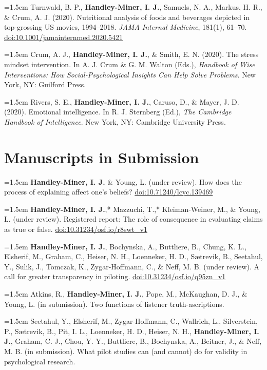 \documentclass[11pt, letterpaper]{article}
\newcommand{\pub}[1]{\par\hangindent=1.5em\hangafter=1 #1\par\vspace{0.4em}}
\begin{document}
\pub{Turnwald, B. P., \textbf{Handley-Miner, I. J.}, Samuels, N. A., Markus, H. R., \& Crum, A. J. (2020). Nutritional analysis of foods and beverages depicted in top-grossing US movies, 1994--2018. \textit{JAMA Internal Medicine}, 181(1), 61--70. \href{https://doi.org/10.1001/jamainternmed.2020.5421}{doi:10.1001/jamainternmed.2020.5421}}

\pub{Crum, A. J., \textbf{Handley-Miner, I. J.}, \& Smith, E. N. (2020). The stress mindset intervention. In A. J. Crum \& G. M. Walton (Eds.), \textit{Handbook of Wise Interventions: How Social-Psychological Insights Can Help Solve Problems}. New York, NY: Guilford Press.}

\pub{Rivers, S. E., \textbf{Handley-Miner, I. J.}, Caruso, D., \& Mayer, J. D. (2020). Emotional intelligence. In R. J. Sternberg (Ed.), \textit{The Cambridge Handbook of Intelligence}. New York, NY: Cambridge University Press.}

\section{Manuscripts in Submission}

\pub{\textbf{Handley-Miner, I. J.} \& Young, L. (under review). How does the process of explaining affect one's beliefs? \href{https://doi.org/10.71240/lcyc.139469}{doi:10.71240/lcyc.139469}}

\pub{\textbf{Handley-Miner, I. J.},* Mazzuchi, T.,* Kleiman-Weiner, M., \& Young, L. (under review). Registered report: The role of consequence in evaluating claims as true or false. \href{https://doi.org/10.31234/osf.io/r8swt_v1}{doi:10.31234/osf.io/r8swt\_v1}}

\pub{\textbf{Handley-Miner, I. J.}, Bochynska, A., Buttliere, B., Chung, K. L., Elsherif, M., Graham, C., Heiser, N. H., Loenneker, H. D., S\ae trevik, B., Seetahul, Y., Sulik, J., Tomczak, K., Zygar-Hoffmann, C., \& Neff, M. B. (under review). A call for greater transparency in piloting. \href{https://doi.org/10.31234/osf.io/q95zn_v1}{doi:10.31234/osf.io/q95zn\_v1}}

\pub{Atkins, R., \textbf{Handley-Miner, I. J.}, Pope, M., McKaughan, D. J., \& Young, L. (in submission). Two functions of listener truth-ascriptions.}

\pub{Seetahul, Y., Elsherif, M., Zygar-Hoffmann, C., Wallrich, L., Silverstein, P., S\ae trevik, B., Pit, I. L., Loenneker, H. D., Heiser, N. H., \textbf{Handley-Miner, I. J.}, Graham, C. J., Chou, Y. Y., Buttliere, B., Bochynska, A., Beitner, J., \& Neff, M. B. (in submission). What pilot studies can (and cannot) do for validity in psychological research.}
\end{document}
